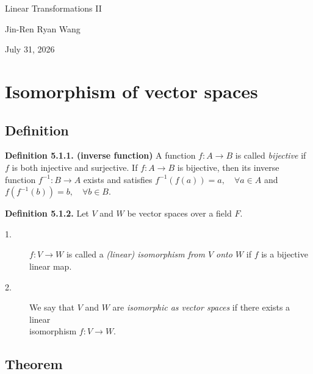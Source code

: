 \documentclass[12pt]{article}
\begin{document}
\begin{titlepage}
    \centering

    \vspace*{\fill}

    {\Huge Linear Transformations II}

    \vspace{1cm}

    {\Large Jin-Ren Ryan Wang\par}

    \vspace{0.5cm}

    {\large July 31, 2026\par}

    \vspace*{\fill}
\end{titlepage}

\tableofcontents

\newpage

\section{Isomorphism of vector spaces}

\subsection{Definition}

\textbf{Definition 5.1.1. (inverse function)}
A function $f:A\to B$ is called \emph{bijective} if $f$ is both injective and surjective.
If $f:A\to B$ is bijective, then its inverse function $f^{-1}:B\to A$ exists and satisfies
$f^{-1}(f(a))=a,\quad \forall a\in A$ and $f\!\left(f^{-1}(b)\right)=b,\quad \forall b\in B$.

\medskip

\textbf{Definition 5.1.2.}
Let $V$ and $W$ be vector spaces over a field $F$.

\begin{description}
    \item[1.] $f:V\to W$ is called a \emph{(linear) isomorphism from $V$ onto $W$} if $f$ is a bijective\\
    linear map.

    \item[2.] We say that $V$ and $W$ are \emph{isomorphic as vector spaces} if there exists a linear\\
    isomorphism $f:V\to W$.
\end{description}

\subsection{Theorem}
\end{document}
